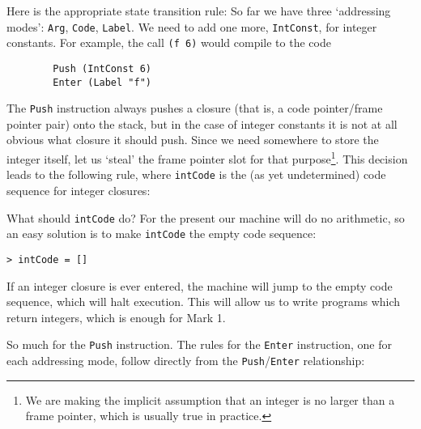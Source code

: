 Here is the appropriate state transition rule:
So far we have three `addressing modes':
\mbox{\tt Arg}, \mbox{\tt Code}, \mbox{\tt Label}.  We need
to add one more, \mbox{\tt IntConst}, for integer constants.  For example, the call
\mbox{\tt (f\ 6)} would compile to the code
\begin{verbatim}
        Push (IntConst 6)
        Enter (Label "f")
\end{verbatim}

The \mbox{\tt Push} instruction always pushes a closure (that is, a
code pointer/frame pointer pair)
onto the stack, but in the case of integer constants it is
not at all obvious what closure it should push.
Since we need somewhere to store
the integer
itself, let us `steal' the frame pointer slot for that
purpose\footnote{%
We are making the implicit assumption
that an integer is no larger than a frame pointer, which
is usually true in practice.
}.  This decision leads to the following rule, where \mbox{\tt intCode} is the
(as yet undetermined) code sequence for integer closures:
\timrule
{}
{}
\label{rule:intconst}

What should \mbox{\tt intCode} do?  For the present our machine will do no arithmetic,
so an easy solution is to make \mbox{\tt intCode} the empty code sequence:
\begin{verbatim}
> intCode = []
\end{verbatim}
%
If an integer closure is ever entered, the machine will jump to the
empty code sequence, which will halt execution.  This will allow us
to write programs which return integers, which is enough for Mark 1.

So much for the \mbox{\tt Push} instruction.
The rules for the \mbox{\tt Enter} instruction, one for each addressing mode,
follow directly from the \mbox{\tt Push}/\mbox{\tt Enter} relationship:
 \label{rule:tim:enter-code}

